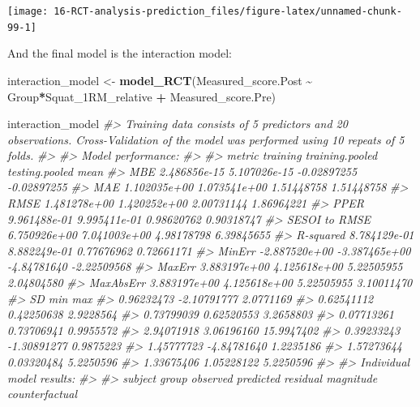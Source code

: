 \documentclass[
]{book}
\newenvironment{Shaded}{\begin{snugshade}}{\end{snugshade}}
\newcommand{\CommentTok}[1]{\textcolor[rgb]{0.56,0.35,0.01}{\textit{#1}}}
\newcommand{\KeywordTok}[1]{\textcolor[rgb]{0.13,0.29,0.53}{\textbf{#1}}}
\newcommand{\NormalTok}[1]{#1}
\newcommand{\OperatorTok}[1]{\textcolor[rgb]{0.81,0.36,0.00}{\textbf{#1}}}
\newcommand{\StringTok}[1]{\textcolor[rgb]{0.31,0.60,0.02}{#1}}
\begin{document}
\begin{center}\texttt{[image: 16-RCT-analysis-prediction\_files/figure-latex/unnamed-chunk-99-1]} \end{center}

And the final model is the interaction model:

\begin{Shaded}
\begin{Highlighting}[]
\NormalTok{interaction\_model <{-}}\StringTok{ }\KeywordTok{model\_RCT}\NormalTok{(Measured\_score.Post }\OperatorTok{\textasciitilde{}}\StringTok{ }\NormalTok{Group}\OperatorTok{*}\NormalTok{Squat\_1RM\_relative }\OperatorTok{+}\StringTok{ }\NormalTok{Measured\_score.Pre)}

\NormalTok{interaction\_model}
\CommentTok{\#> Training data consists of 5 predictors and 20 observations. Cross{-}Validation of the model was performed using 10 repeats of 5 folds.}
\CommentTok{\#> }
\CommentTok{\#> Model performance:}
\CommentTok{\#> }
\CommentTok{\#>         metric      training training.pooled testing.pooled        mean}
\CommentTok{\#>            MBE  2.486856e{-}15    5.107026e{-}15    {-}0.02897255 {-}0.02897255}
\CommentTok{\#>            MAE  1.102035e+00    1.073541e+00     1.51448758  1.51448758}
\CommentTok{\#>           RMSE  1.481278e+00    1.420252e+00     2.00731144  1.86964221}
\CommentTok{\#>           PPER  9.961488e{-}01    9.995411e{-}01     0.98620762  0.90318747}
\CommentTok{\#>  SESOI to RMSE  6.750926e+00    7.041003e+00     4.98178798  6.39845655}
\CommentTok{\#>      R{-}squared  8.784129e{-}01    8.882249e{-}01     0.77676962  0.72661171}
\CommentTok{\#>         MinErr {-}2.887520e+00   {-}3.387465e+00    {-}4.84781640 {-}2.22509568}
\CommentTok{\#>         MaxErr  3.883197e+00    4.125618e+00     5.22505955  2.04804580}
\CommentTok{\#>      MaxAbsErr  3.883197e+00    4.125618e+00     5.22505955  3.10011470}
\CommentTok{\#>          SD         min        max}
\CommentTok{\#>  0.96232473 {-}2.10791777  2.0771169}
\CommentTok{\#>  0.62541112  0.42250638  2.9228564}
\CommentTok{\#>  0.73799039  0.62520553  3.2658803}
\CommentTok{\#>  0.07713261  0.73706941  0.9955572}
\CommentTok{\#>  2.94071918  3.06196160 15.9947402}
\CommentTok{\#>  0.39233243 {-}1.30891277  0.9875223}
\CommentTok{\#>  1.45777723 {-}4.84781640  1.2235186}
\CommentTok{\#>  1.57273644  0.03320484  5.2250596}
\CommentTok{\#>  1.33675406  1.05228122  5.2250596}
\CommentTok{\#> }
\CommentTok{\#> Individual model results:}
\CommentTok{\#> }
\CommentTok{\#>     subject     group observed predicted    residual  magnitude counterfactual}

\end{Highlighting}
\end{Shaded}
\end{document}
